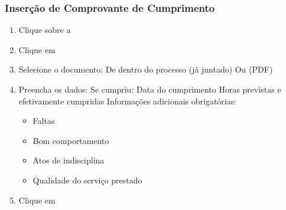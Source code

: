 \documentclass[letterpaper,10pt,brazil]{sphinxmanual}
\begin{document}
\subsubsection{Inserção de Comprovante de Cumprimento}
\label{\detokenize{projud_58_cadastrocumprimentomedida:insercao-de-comprovante-de-cumprimento}}\begin{enumerate}
%
\item {} 
\sphinxAtStartPar
Clique sobre a 

\item {} 
\sphinxAtStartPar
Clique em 

\item {} 
\sphinxAtStartPar
Selecione o documento:
\sphinxhyphen{} De dentro do processo (já juntado)
\sphinxhyphen{} Ou  (PDF)

\item {} 
\sphinxAtStartPar
Preencha os dados:
\sphinxhyphen{} Se cumpriu: 
\sphinxhyphen{} Data do cumprimento
\sphinxhyphen{} Horas previstas e efetivamente cumpridas
\sphinxhyphen{} Informações adicionais obrigatórias:
\begin{itemize}
\item {} 
\sphinxAtStartPar
Faltas

\item {} 
\sphinxAtStartPar
Bom comportamento

\item {} 
\sphinxAtStartPar
Atos de indisciplina

\item {} 
\sphinxAtStartPar
Qualidade do serviço prestado

\end{itemize}

\item {} 
\sphinxAtStartPar
Clique em 

\end{enumerate}
\end{document}
